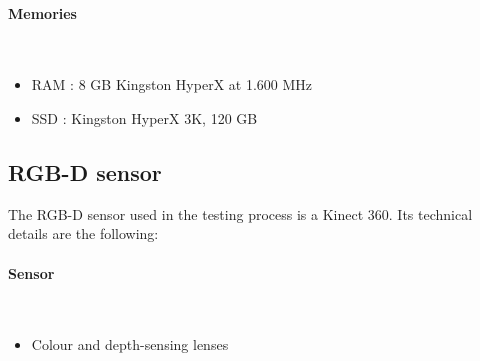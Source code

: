
	\paragraph{Memories} \mbox{}\\
		\begin{itemize}
			\item{RAM : 8 GB Kingston HyperX at 1.600 MHz }
			\item{SSD : Kingston HyperX 3K, 120 GB}
		\end{itemize}



\subsection{RGB-D sensor}
	The RGB-D sensor used in the testing process is a Kinect 360. 
	Its technical details are the following: 

	\paragraph{ Sensor} \mbox{} \\
		\begin{itemize}
			\item Colour and depth-sensing lenses
		\end{itemize}

